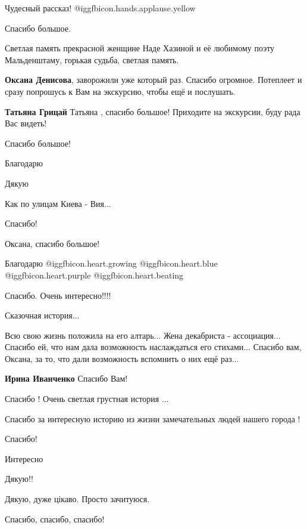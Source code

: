 \begin{itemize}
Чудесный рассказ! @igg{fbicon.hands.applause.yellow} 

Спасибо большое.

Светлая память прекрасной женщине Наде Хазиной и её любимому поэту Мальденштаму, горькая судьба, светлая память.

\textbf{Оксана Денисова}, заворожили уже который раз. Спасибо огромное.
Потеплеет и сразу попрошусь к Вам на экскурсию, чтобы ещё и послушать.

\textbf{Татьяна Грицай} Татьяна , спасибо большое! Приходите на экскурсии, буду рада Вас видеть!

Спасибо большое!

Благодарю

Дякую

Как по улицам Киева - Вия...

Спасибо!

Оксана, спасибо большое!

Благодарю @igg{fbicon.heart.growing}  @igg{fbicon.heart.blue}
@igg{fbicon.heart.purple}  @igg{fbicon.heart.beating} 

Спасибо. Очень интересно!!!!

Сказочная история...


Всю свою жизнь положила на его алтарь... Жена декабриста - ассоциация... Спасибо
ей, что нам дала возможность наслаждаться его стихами... Спасибо вам, Оксана, за
то, что дали возможность вспомнить о них ещё раз...

\textbf{Ирина Иванченко} Спасибо Вам!

Спасибо !
Очень светлая грустная история ...

Спасибо за интересную историю из жизни замечательных людей нашего города !

Спасибо!

Интересно

Дякую!!

Дякую, дуже цікаво. Просто зачитуюся.

Спасибо, спасибо, спасибо!


\end{itemize}
